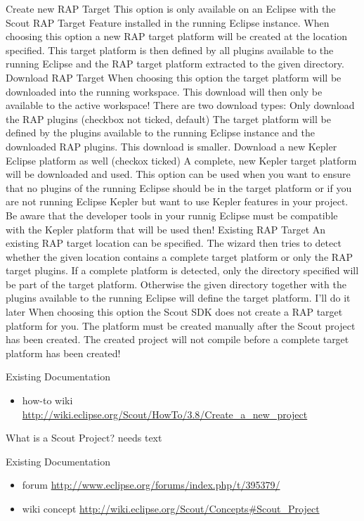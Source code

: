 \documentclass[a4paper,10pt,twoside]{book}
\begin{document}
    Create new RAP Target
    This option is only available on an Eclipse with the Scout RAP Target Feature installed in the running Eclipse instance.
    When choosing this option a new RAP target platform will be created at the location specified. This target platform is then defined by all plugins available to the running Eclipse and the RAP target platform extracted to the given directory.
    Download RAP Target
    When choosing this option the target platform will be downloaded into the running workspace. This download will then only be available to the active workspace! There are two download types:
        Only download the RAP plugins (checkbox not ticked, default)
        The target platform will be defined by the plugins available to the running Eclipse instance and the downloaded RAP plugins. This download is smaller.
        Download a new Kepler Eclipse platform as well (checkox ticked)
        A complete, new Kepler target platform will be downloaded and used. This option can be used when you want to ensure that no plugins of the running Eclipse should be in the target platform or if you are not running Eclipse Kepler but want to use Kepler features in your project.
        Be aware that the developer tools in your runnig Eclipse must be compatible with the Kepler platform that will be used then! 
    Existing RAP Target
    An existing RAP target location can be specified. The wizard then tries to detect whether the given location contains a complete target platform or only the RAP target plugins. If a complete platform is detected, only the directory specified will be part of the target platform. Otherwise the given directory together with the plugins available to the running Eclipse will define the target platform.
    I'll do it later
    When choosing this option the Scout SDK does not create a RAP target platform for you. The platform must be created manually after the Scout project has been created. The created project will not compile before a complete target platform has been created! 
	
\noindent Existing Documentation
\begin{itemize}
  \item how-to wiki \url{http://wiki.eclipse.org/Scout/HowTo/3.8/Create_a_new_project}
\end{itemize}

What is a Scout Project?
needs text

\noindent Existing Documentation
\begin{itemize}
  \item forum \url{http://www.eclipse.org/forums/index.php/t/395379/}
  \item wiki concept \url{http://wiki.eclipse.org/Scout/Concepts#Scout_Project}
\end{itemize}
\end{document}
